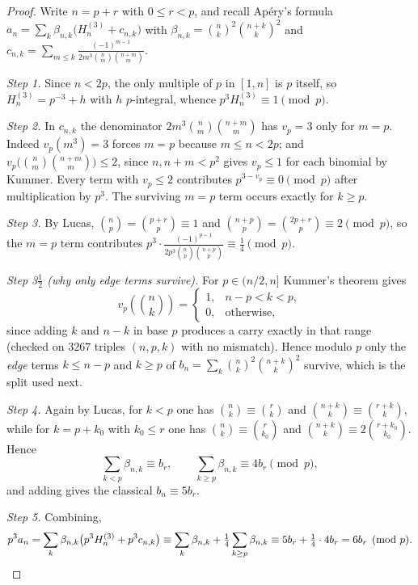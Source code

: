 \begin{proof}
Write $n=p+r$ with $0\le r<p$, and recall Ap\'ery's formula
$a_n=\sum_k\beta_{n,k}\bigl(H^{(3)}_n+c_{n,k}\bigr)$ with
$\beta_{n,k}=\binom nk^2\binom{n+k}k^2$ and
$c_{n,k}=\sum_{m\le k}\frac{(-1)^{m-1}}{2m^3\binom nm\binom{n+m}m}$.

\emph{Step 1.}  Since $n<2p$, the only multiple of $p$ in $[1,n]$ is $p$ itself, so
$H^{(3)}_n=p^{-3}+h$ with $h$ $p$-integral, whence $p^3H^{(3)}_n\equiv1\pmod p$.

\emph{Step 2.}  In $c_{n,k}$ the denominator $2m^3\binom nm\binom{n+m}m$ has $v_p=3$ only for
$m=p$.  Indeed $v_p(m^3)=3$ forces $m=p$ because $m\le n<2p$; and
$v_p\bigl(\binom nm\binom{n+m}m\bigr)\le2$, since $n,n+m<p^2$ gives $v_p\le1$ for each binomial
by Kummer.  Every term with $v_p\le2$ contributes $p^{3-v_p}\equiv0\pmod p$ after multiplication
by $p^3$.  The surviving $m=p$ term occurs exactly for $k\ge p$.

\emph{Step 3.}  By Lucas, $\binom np=\binom{p+r}p\equiv1$ and
$\binom{n+p}p=\binom{2p+r}p\equiv2\pmod p$, so the $m=p$ term contributes
$p^3\cdot\frac{(-1)^{p-1}}{2p^3\binom np\binom{n+p}p}\equiv\frac14\pmod p$.

\emph{Step 3$\tfrac12$ (why only edge terms survive).}  For $p\in(n/2,n]$ Kummer's theorem gives
\[
  v_p\!\left(\binom nk\right)=\begin{cases}1,&n-p<k<p,\\0,&\text{otherwise,}\end{cases}
\]
since adding $k$ and $n-k$ in base $p$ produces a carry exactly in that range (checked on $3267$
triples $(n,p,k)$ with no mismatch).  Hence modulo $p$ only the \emph{edge} terms $k\le n-p$ and
$k\ge p$ of $b_n=\sum_k\binom nk^2\binom{n+k}k^2$ survive, which is the split used next.

\emph{Step 4.}  Again by Lucas, for $k<p$ one has $\binom nk\equiv\binom rk$ and
$\binom{n+k}k\equiv\binom{r+k}k$, while for $k=p+k_0$ with $k_0\le r$ one has
$\binom nk\equiv\binom r{k_0}$ and $\binom{n+k}k\equiv2\binom{r+k_0}{k_0}$.  Hence
\[
  \sum_{k<p}\beta_{n,k}\equiv b_r,\qquad
  \sum_{k\ge p}\beta_{n,k}\equiv4b_r\pmod p,
\]
and adding gives the classical $b_n\equiv5b_r$.

\emph{Step 5.}  Combining,
\[
  p^3a_n=\sum_k\beta_{n,k}\bigl(p^3H^{(3)}_n+p^3c_{n,k}\bigr)
  \equiv\sum_k\beta_{n,k}+\tfrac14\sum_{k\ge p}\beta_{n,k}
  \equiv5b_r+\tfrac14\cdot4b_r=6b_r\pmod p. \qedhere
\]
\end{proof}


